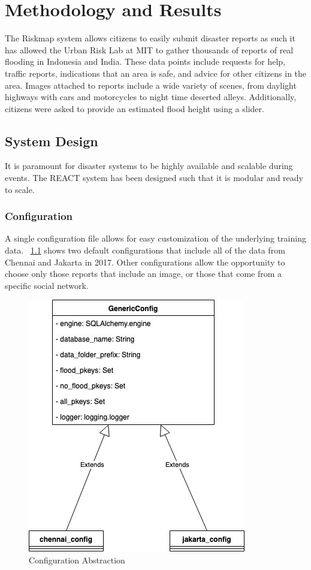 \chapter{Methodology and Results}
The Riskmap system allows citizens to easily submit
disaster reports as such it has allowed the Urban Risk Lab at
MIT to gather thousands of reports of real flooding in Indonesia and India.
These data points include requests for help, traffic reports, indications that an
area is safe, and advice for other citizens in the area. Images attached to
reports include a wide variety of scenes, from daylight highways with cars and
motorcycles to night time deserted alleys. Additionally, citizens were asked to
provide an estimated flood height using a slider.

\section{System Design}
It is paramount for disaster systems to be highly available and scalable during
events. The REACT system has been designed such that it is modular and ready to
scale.

\subsection{Configuration}
A single configuration file allows for easy customization of the underlying 
training data. \figureautorefname{}~\ref{fig:config} shows two default configurations 
that include all of the data from Chennai and Jakarta in 2017. Other 
configurations allow the opportunity to choose only those reports that 
include an image, or those that come from a specific social network.
\begin{figure}[ht]
    \centering
    \includegraphics[scale=0.6]{images/config.jpg}
    \caption{Configuration Abstraction}
    \label{fig:config}
\end{figure}

